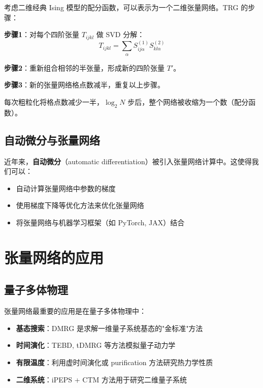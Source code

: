 \documentclass[12pt,a4paper]{ctexart}
\begin{document}
\begin{examplebox}
考虑二维经典 Ising 模型的配分函数，可以表示为一个二维张量网络。TRG 的步骤：

\textbf{步骤1}：对每个四阶张量 $T_{ijkl}$ 做 SVD 分解：
\[
T_{ijkl} = \sum_\alpha S^{(1)}_{ij\alpha} S^{(2)}_{kl\alpha}
\]

\textbf{步骤2}：重新组合相邻的半张量，形成新的四阶张量 $T'$。

\textbf{步骤3}：新的张量网络格点数减半，重复以上步骤。

每次粗粒化将格点数减少一半，$\log_2 N$ 步后，整个网络被收缩为一个数（配分函数）。
\end{examplebox}

\subsection{自动微分与张量网络}

近年来，\textbf{自动微分}（automatic differentiation）被引入张量网络计算中。这使得我们可以：
\begin{itemize}
    \item 自动计算张量网络中参数的梯度
    \item 使用梯度下降等优化方法来优化张量网络
    \item 将张量网络与机器学习框架（如 PyTorch, JAX）结合
\end{itemize}

\section{张量网络的应用}

\subsection{量子多体物理}

张量网络最重要的应用是在量子多体物理中：

\begin{itemize}
    \item \textbf{基态搜索}：DMRG 是求解一维量子系统基态的"金标准"方法
    \item \textbf{时间演化}：TEBD, tDMRG 等方法模拟量子动力学
    \item \textbf{有限温度}：利用虚时间演化或 purification 方法研究热力学性质
    \item \textbf{二维系统}：iPEPS + CTM 方法用于研究二维量子系统
\end{itemize}
\end{document}
